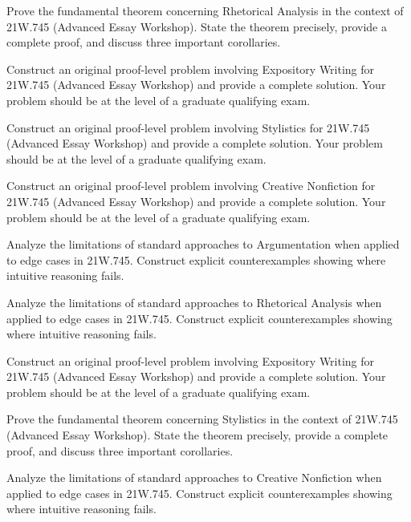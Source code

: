 \documentclass[12pt,a4paper]{exam}
\begin{document}
\begin{questions}
\vspace{0.3cm}

\question[4]
Prove the fundamental theorem concerning Rhetorical Analysis in the context of 21W.745 (Advanced Essay Workshop). State the theorem precisely, provide a complete proof, and discuss three important corollaries.

\vspace{0.3cm}

\question[6]
Construct an original proof-level problem involving Expository Writing for 21W.745 (Advanced Essay Workshop) and provide a complete solution. Your problem should be at the level of a graduate qualifying exam.

\vspace{0.3cm}

\question[5]
Construct an original proof-level problem involving Stylistics for 21W.745 (Advanced Essay Workshop) and provide a complete solution. Your problem should be at the level of a graduate qualifying exam.

\vspace{0.3cm}

\question[4]
Construct an original proof-level problem involving Creative Nonfiction for 21W.745 (Advanced Essay Workshop) and provide a complete solution. Your problem should be at the level of a graduate qualifying exam.

\vspace{0.3cm}

\question[3]
Analyze the limitations of standard approaches to Argumentation when applied to edge cases in 21W.745. Construct explicit counterexamples showing where intuitive reasoning fails.

\vspace{0.3cm}

\question[2]
Analyze the limitations of standard approaches to Rhetorical Analysis when applied to edge cases in 21W.745. Construct explicit counterexamples showing where intuitive reasoning fails.

\vspace{0.3cm}

\question[6]
Construct an original proof-level problem involving Expository Writing for 21W.745 (Advanced Essay Workshop) and provide a complete solution. Your problem should be at the level of a graduate qualifying exam.

\vspace{0.3cm}

\question[4]
Prove the fundamental theorem concerning Stylistics in the context of 21W.745 (Advanced Essay Workshop). State the theorem precisely, provide a complete proof, and discuss three important corollaries.

\vspace{0.3cm}

\question[3]
Analyze the limitations of standard approaches to Creative Nonfiction when applied to edge cases in 21W.745. Construct explicit counterexamples showing where intuitive reasoning fails.

\vspace{0.3cm}

\end{questions}
\end{document}
